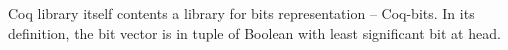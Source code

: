 


Coq library itself contents a library for bits representation -- Coq-bits.
In its definition, the bit vector is in tuple of Boolean with least significant bit at head.

% 


